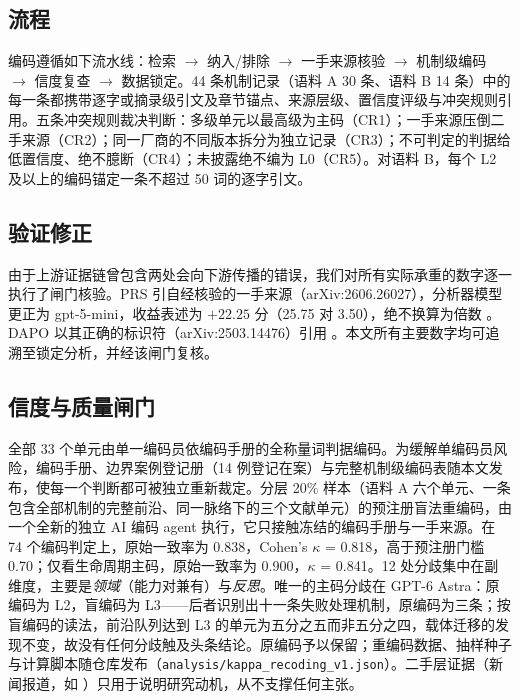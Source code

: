 \documentclass[10pt,fontset=fandol]{ctexart}
\begin{document}
\subsection{流程}

编码遵循如下流水线：检索 $\rightarrow$ 纳入/排除 $\rightarrow$ 一手来源核验 $\rightarrow$ 机制级编码 $\rightarrow$ 信度复查 $\rightarrow$ 数据锁定。44 条机制记录（语料 A 30 条、语料 B 14 条）中的每一条都携带逐字或摘录级引文及章节锚点、来源层级、置信度评级与冲突规则引用。五条冲突规则裁决判断：多级单元以最高级为主码（CR1）；一手来源压倒二手来源（CR2）；同一厂商的不同版本拆分为独立记录（CR3）；不可判定的判据给低置信度、绝不臆断（CR4）；未披露绝不编为 L0（CR5）。对语料 B，每个 L2 及以上的编码锚定一条不超过 50 词的逐字引文。

\subsection{验证修正}

由于上游证据链曾包含两处会向下游传播的错误，我们对所有实际承重的数字逐一执行了闸门核验。PRS 引自经核验的一手来源（arXiv:2606.26027），分析器模型更正为 gpt-5-mini，收益表述为 $+22.25$ 分（25.75 对 3.50），绝不换算为倍数 \cite{hao2026prs}。DAPO 以其正确的标识符（arXiv:2503.14476）引用 \cite{yu2025dapo}。本文所有主要数字均可追溯至锁定分析，并经该闸门复核。

\subsection{信度与质量闸门}

全部 33 个单元由单一编码员依编码手册的全称量词判据编码。为缓解单编码员风险，编码手册、边界案例登记册（14 例登记在案）与完整机制级编码表随本文发布，使每一个判断都可被独立重新裁定。分层 20\% 样本（语料 A 六个单元、一条包含全部机制的完整前沿、同一脉络下的三个文献单元）的预注册盲法重编码，由一个全新的独立 AI 编码 agent 执行，它只接触冻结的编码手册与一手来源。在 74 个编码判定上，原始一致率为 0.838，Cohen's $\kappa$ = 0.818，高于预注册门槛 0.70；仅看生命周期主码，原始一致率为 0.900，$\kappa$ = 0.841。12 处分歧集中在副维度，主要是\emph{领域}（能力对兼有）与\emph{反思}。唯一的主码分歧在 GPT-6 Astra：原编码为 L2，盲编码为 L3——后者识别出十一条失败处理机制，原编码为三条；按盲编码的读法，前沿队列达到 L3 的单元为五分之五而非五分之四，载体迁移的发现不变，故没有任何分歧触及头条结论。原编码予以保留；重编码数据、抽样种子与计算脚本随仓库发布（\texttt{analysis/kappa\_recoding\_v1.json}）。二手层证据（新闻报道，如 \cite{waic2026}）只用于说明研究动机，从不支撑任何主张。
\end{document}
